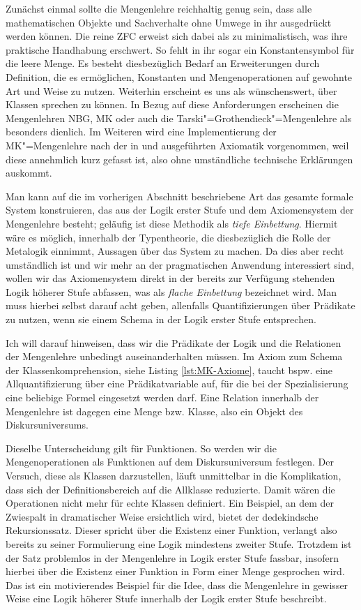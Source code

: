 Zunächst einmal sollte die Mengenlehre reichhaltig genug sein, dass
alle mathematischen Objekte und Sachverhalte ohne Umwege in ihr
ausgedrückt werden können. Die reine ZFC erweist sich dabei als zu
minimalistisch, was ihre praktische Handhabung erschwert. So fehlt in ihr
sogar ein Konstantensymbol für die leere Menge. Es besteht diesbezüglich
Bedarf an Erweiterungen durch Definition, die es ermöglichen,
Konstanten und Mengenoperationen auf gewohnte Art und Weise zu nutzen.
Weiterhin erscheint es uns als wünschenswert, über Klassen sprechen
zu können. In Bezug auf diese Anforderungen erscheinen die Mengenlehren
NBG, MK oder auch die Tarski"=Grothendieck"=Mengenlehre als besonders
dienlich. Im Weiteren wird eine Implementierung der MK"=Mengenlehre%
 nach der in \cite{Kelley} und
\cite{Tianyu-Sun} ausgeführten Axiomatik vorgenommen, weil diese
annehmlich kurz gefasst ist, also ohne umständliche technische
Erklärungen auskommt.

Man kann auf die im vorherigen Abschnitt beschriebene Art das gesamte
formale System konstruieren, das aus der Logik erster Stufe und dem
Axiomensystem der Mengenlehre besteht; geläufig ist diese Methodik
als \emph{tiefe Einbettung}. Hiermit wäre es möglich, innerhalb der
Typentheorie, die diesbezüglich die Rolle der Metalogik einnimmt,
Aussagen über das System zu machen. Da dies aber recht umständlich
ist und wir mehr an der pragmatischen Anwendung interessiert sind, wollen
wir das Axiomensystem direkt in der bereits zur Verfügung stehenden Logik
höherer Stufe abfassen, was als \emph{flache Einbettung} bezeichnet wird.
Man muss hierbei selbst darauf acht geben, allenfalls Quantifizierungen
über Prädikate zu nutzen, wenn sie einem Schema in der Logik erster Stufe
entsprechen.

Ich will darauf hinweisen, dass wir die Prädikate der Logik und die
Relationen der Mengenlehre unbedingt auseinanderhalten müssen. Im Axiom
 zum Schema der Klassenkomprehension, siehe Listing
\ref{lst:MK-Axiome}, taucht bspw. eine Allquantifizierung über eine
Prädikatvariable auf, für die bei der Spezialisierung eine beliebige
Formel eingesetzt werden darf. Eine Relation innerhalb der Mengenlehre
ist dagegen eine Menge bzw. Klasse, also ein Objekt des Diskursuniversums.

Dieselbe Unterscheidung gilt für Funktionen. So werden wir die
Mengenoperationen als Funktionen auf dem Diskursuniversum festlegen.
Der Versuch, diese als Klassen darzustellen, läuft unmittelbar in die
Komplikation, dass sich der Definitionsbereich auf die Allklasse reduzierte.
Damit wären die Operationen nicht mehr für echte Klassen definiert.
Ein Beispiel, an dem der Zwiespalt in dramatischer Weise ersichtlich wird,
bietet der dedekindsche Rekursionssatz. Dieser spricht über die Existenz
einer Funktion, verlangt also bereits zu seiner Formulierung eine Logik
mindestens zweiter Stufe. Trotzdem ist der Satz problemlos in der Mengenlehre
in Logik erster Stufe fassbar, insofern hierbei über die Existenz einer
Funktion in Form einer Menge gesprochen wird. Das ist ein motivierendes
Beispiel für die Idee, dass die Mengenlehre in gewisser Weise eine Logik
höherer Stufe innerhalb der Logik erster Stufe beschreibt.


